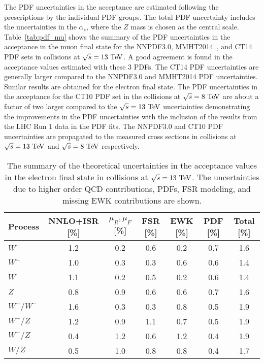 The PDF uncertainties in the acceptance are estimated following the prescriptions by the individual PDF groups. The total PDF uncertainty includes the  uncertainties in the $\alpha_s$, where the $Z$ mass is chosen as the central scale.  Table~\ref{tab:pdf_mu} shows the summary of the PDF uncertainties in the acceptance in the muon final state for the NNPDF3.0, MMHT2014~\cite{Harland-Lang:2014zoa}, and CT14~\cite{Dulat:2015mca} PDF sets in collisions at $\sqrt{s}=13~\mathrm{Te\kern -0.1em V}$. A good agreement is found in the acceptance values estimated with these $3$ PDFs. The CT14 PDF uncertainties are generally larger compared to the NNPDF3.0 and MMHT2014 PDF uncertainties. Similar results are obtained for the electron final state. The PDF uncertainties in the acceptance for the CT10 PDF set in the collisions at $\sqrt{s}=8~\mathrm{Te\kern -0.1em V}$ are about a factor of two larger compared to the $\sqrt{s}=13~\mathrm{Te\kern -0.1em V}$ uncertainties demonstrating the improvements in the PDF uncertainties with the inclusion of the results from the LHC Run $1$ data in the PDF fits. The NNPDF3.0 and CT10 PDF uncertainties are propagated to the measured cross sections in collisions at $\sqrt{s}=13~\mathrm{Te\kern -0.1em V}$ and $\sqrt{s}=8~\mathrm{Te\kern -0.1em V}$ respectively.     
\begin{table}[htbp]
\begin{center}
\begin{tabular}{|l|c|c|c|c|c|c|}
\hline
Process & NNLO+ISR [\%] & $\mu_{R}\mathrm{,}\mu_{F}$ [\%] & FSR [\%] & EWK [\%] & PDF [\%]& Total [\%] \\
\hline\hline
$W^+$        & 1.2 &  0.2 & 0.6  & 0.2 & 0.7 & 1.6 \\
$W^-$  & 1.0 &  0.3 & 0.3  & 0.6 & 0.6 & 1.4 \\
$W$            & 1.1 &  0.2 & 0.5  & 0.2 & 0.6 & 1.4 \\
$Z$              & 0.8 &  0.9 & 0.6  & 0.6 & 0.7 & 1.6 \\
$W^+/W^-$                      & 1.6 &  0.3 & 0.3  & 0.8 & 0.5 & 1.9 \\
$W^+/Z$                         & 1.2 &  0.9 & 1.1  & 0.7 & 0.5 & 1.9 \\
$W^-/Z$                         & 0.4 &  1.2 & 0.6  & 1.2 & 0.4 & 1.9 \\
$W/Z$                          & 0.5 &  1.0 & 0.8  & 0.8 & 0.4 & 1.7 \\
\hline\hline
\end{tabular}
\caption{The summary of the theoretical uncertainties in the acceptance values in the electron final state in collisions at $\sqrt{s}=13~\mathrm{Te\kern -0.1em V}$. The uncertainties due to higher order QCD contributions, PDFs, FSR modeling, and missing EWK contributions are shown.}
\label{tab_el}
\end{center}
\end{table}

